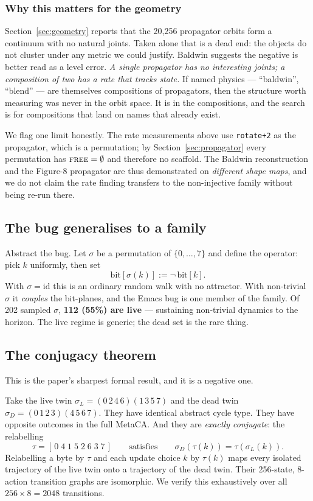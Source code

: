 \documentclass[man,12pt,floatsintext]{apa7}
\newcommand{\sig}{\sigma}
\newcommand{\bit}[1]{\mathrm{bit}[#1]}
\begin{document}
\subsubsection{Why this matters for the geometry}

Section~\ref{sec:geometry} reports that the 20{,}256 propagator orbits form a
continuum with no natural joints. Taken alone that is a dead end: the objects do
not cluster under any metric we could justify. Baldwin suggests the negative is
better read as a level error. \emph{A single propagator has no interesting
joints; a composition of two has a rate that tracks state.} If named physics ---
``baldwin'', ``blend'' --- are themselves compositions of propagators, then the
structure worth measuring was never in the orbit space. It is in the
compositions, and the search is for compositions that land on names that already
exist.

We flag one limit honestly. The rate measurements above use
\texttt{rotate+2} as the propagator, which is a permutation; by
Section~\ref{sec:propagator} every permutation has $\textsc{free} = \emptyset$
and therefore no scaffold. The Baldwin reconstruction and the Figure-8
propagator are thus demonstrated on \emph{different shape maps}, and we do not
claim the rate finding transfers to the non-injective family without being
re-run there.

\subsection{The bug generalises to a family}
\label{sec:family}

Abstract the bug. Let $\sig$ be a permutation of $\{0,\dots,7\}$ and
define the operator: pick $k$ uniformly, then set
\[
  \bit{\sig(k)} := \lnot\, \bit{k}.
\]
With $\sig = \mathrm{id}$ this is an ordinary random walk with no
attractor. With non-trivial $\sig$ it \emph{couples} the bit-planes, and
the Emacs bug is one member of the family. Of 202 sampled $\sig$,
\textbf{112 (55\%) are live} --- sustaining non-trivial dynamics to the
horizon. The live regime is generic; the dead set is the rare thing.

\subsection{The conjugacy theorem}
\label{sec:conjugacy}

This is the paper's sharpest formal result, and it is a negative one.

Take the live twin $\sig_L = (0\,2\,4\,6)(1\,3\,5\,7)$ and the dead twin
$\sig_D = (0\,1\,2\,3)(4\,5\,6\,7)$. They have identical abstract cycle
type. They have opposite outcomes in the full MetaCA. And they are
\emph{exactly conjugate}: the relabelling
\[
  \tau = [\,0\;4\;1\;5\;2\;6\;3\;7\,]
  \qquad\text{satisfies}\qquad
  \sig_D(\tau(k)) = \tau(\sig_L(k)).
\]
Relabelling a byte by $\tau$ and each update choice $k$ by $\tau(k)$ maps
every isolated trajectory of the live twin onto a trajectory of the dead
twin. Their 256-state, 8-action transition graphs are isomorphic. We
verify this exhaustively over all $256 \times 8 = 2048$ transitions.
\end{document}

